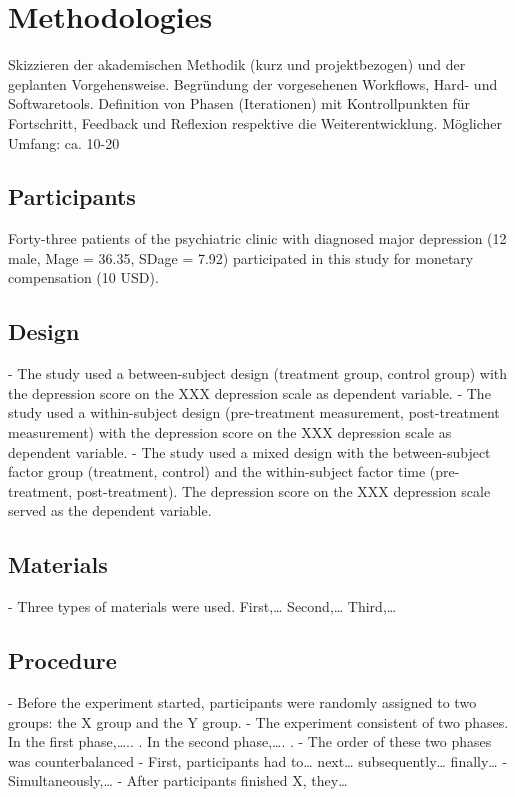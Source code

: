 \chapter{Methodologies}

Skizzieren der akademischen Methodik (kurz und projektbezogen) und der geplanten Vorgehensweise. Begründung der vorgesehenen Workflows, Hard- und Softwaretools. Definition von Phasen (Iterationen) mit Kontrollpunkten für Fortschritt, Feedback und Reflexion respektive die Weiterentwicklung. Möglicher Umfang: ca. 10-20%

\section{Participants}
\label{participants}

Forty-three patients of the psychiatric clinic with diagnosed major depression (12 male, Mage = 36.35, SDage = 7.92) participated in this study for monetary compensation (10 USD).

\section{Design}
\label{design}

- The study used a between-subject design (treatment group, control group) with the
depression score on the XXX depression scale as dependent variable.
- The study used a within-subject design (pre-treatment measurement, post-treatment
measurement) with the depression score on the XXX depression scale as dependent variable.
- The study used a mixed design with the between-subject factor group (treatment, control) and the within-subject factor time (pre-treatment, post-treatment). The depression score on the XXX depression scale served as the dependent variable.

\section{Materials}
\label{materials}

- Three types of materials were used. First,… Second,… Third,…

\section{Procedure}
\label{procedure}

- Before the experiment started, participants were randomly assigned to two groups: the X group and the Y group.
- The experiment consistent of two phases. In the first phase,….. . In the second phase,…. .
- The order of these two phases was counterbalanced
- First, participants had to… next… subsequently… finally…
- Simultaneously,…
- After participants finished X, they… %

